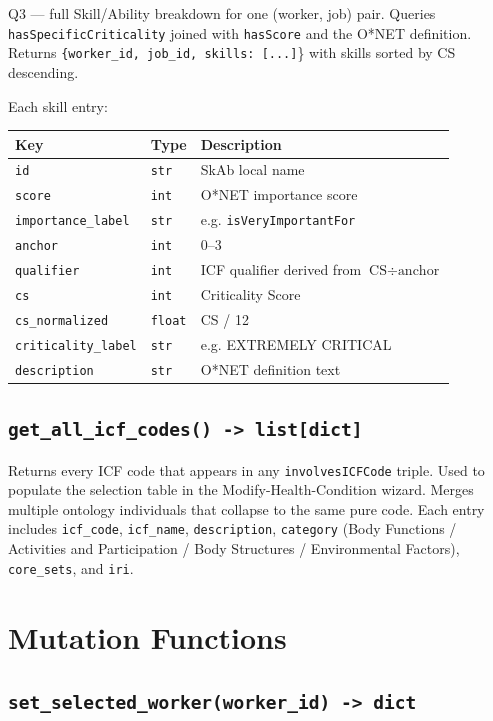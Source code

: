 ﻿\documentclass[12pt,a4paper]{article}
\begin{document}
Q3 --- full Skill/Ability breakdown for one (worker, job) pair. Queries \texttt{hasSpecificCriticality} joined with \texttt{hasScore} and the O*NET definition. Returns \texttt{\{worker\_id, job\_id, skills: [...]}\} with skills sorted by CS descending.

Each skill entry:

\begin{longtable}{@{}P{4cm}P{2.5cm}P{8cm}@{}}
\toprule
\textbf{Key} & \textbf{Type} & \textbf{Description} \\
\midrule
\endhead
\texttt{id} & \texttt{str} & SkAb local name \\
\texttt{score} & \texttt{int} & O*NET importance score \\
\texttt{importance\_label} & \texttt{str} & e.g. \texttt{isVeryImportantFor} \\
\texttt{anchor} & \texttt{int} & 0--3 \\
\texttt{qualifier} & \texttt{int} & ICF qualifier derived from $\text{CS} \div \text{anchor}$ \\
\texttt{cs} & \texttt{int} & Criticality Score \\
\texttt{cs\_normalized} & \texttt{float} & CS / 12 \\
\texttt{criticality\_label} & \texttt{str} & e.g. EXTREMELY CRITICAL \\
\texttt{description} & \texttt{str} & O*NET definition text \\
\bottomrule
\end{longtable}

\subsection{\texttt{get\_all\_icf\_codes() -> list[dict]}}

Returns every ICF code that appears in any \texttt{involvesICFCode} triple. Used to populate the selection table in the Modify-Health-Condition wizard. Merges multiple ontology individuals that collapse to the same pure code. Each entry includes \texttt{icf\_code}, \texttt{icf\_name}, \texttt{description}, \texttt{category} (Body Functions / Activities and Participation / Body Structures / Environmental Factors), \texttt{core\_sets}, and \texttt{iri}.

\clearpage
\section{Mutation Functions}

\subsection{\texttt{set\_selected\_worker(worker\_id) -> dict}}
\end{document}
